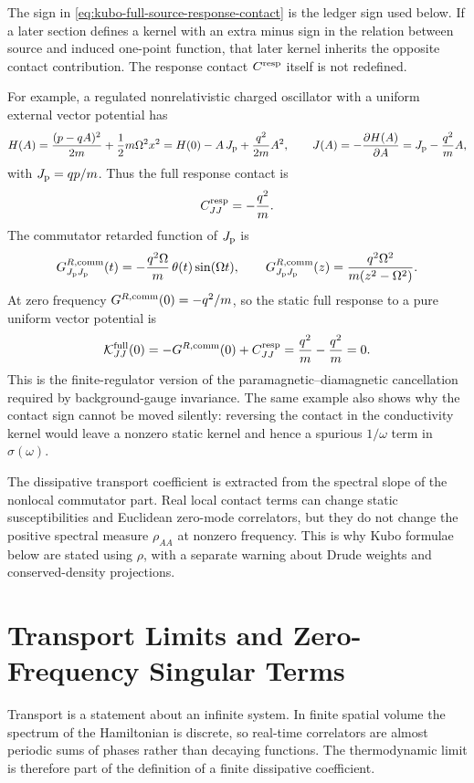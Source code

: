 The sign in \eqref{eq:kubo-full-source-response-contact} is the ledger sign
used below.  If a later section defines a kernel with an extra minus sign in
the relation between source and induced one-point function, that later kernel
inherits the opposite contact contribution.  The response contact
\(C^{\rm resp}\) itself is not redefined.

For example, a regulated nonrelativistic charged oscillator with a uniform
external vector potential has
\[
  H(A)=\frac{(p-qA)^2}{2m}+\frac12m\Omega^2x^2
  =
  H(0)-A\,J_{\rm p}+\frac{q^2}{2m}A^2,
  \qquad
  J(A)=-\frac{\partial H(A)}{\partial A}
  =J_{\rm p}-\frac{q^2}{m}A,
\]
with \(J_{\rm p}=qp/m\).  Thus the full response contact is
\[
  C^{\rm resp}_{JJ}=-\frac{q^2}{m}.
\]
The commutator retarded function of \(J_{\rm p}\) is
\[
  G^{R,\rm comm}_{J_{\rm p}J_{\rm p}}(t)
  =
  -\frac{q^2\Omega}{m}\,\theta(t)\sin(\Omega t),
  \qquad
  G^{R,\rm comm}_{J_{\rm p}J_{\rm p}}(z)
  =
  \frac{q^2\Omega^2}{m(z^2-\Omega^2)}.
\]
At zero frequency \(G^{R,\rm comm}(0)=-q^2/m\), so the static full response
to a pure uniform vector potential is
\[
  \mathcal K^{\rm full}_{JJ}(0)
  =
  -G^{R,\rm comm}(0)+C^{\rm resp}_{JJ}
  =
  \frac{q^2}{m}-\frac{q^2}{m}
  =
  0.
\]
This is the finite-regulator version of the paramagnetic--diamagnetic
cancellation required by background-gauge invariance.  The same example also
shows why the contact sign cannot be moved silently: reversing the contact in
the conductivity kernel would leave a nonzero static kernel and hence a
spurious \(1/\omega\) term in \(\sigma(\omega)\).

The dissipative transport coefficient is extracted from the spectral slope
of the nonlocal commutator part.  Real local contact terms can change static
susceptibilities and Euclidean zero-mode correlators, but they do not change
the positive spectral measure \(\rho_{AA}\) at nonzero frequency.  This is
why Kubo formulae below are stated using \(\rho\), with a separate warning
about Drude weights and conserved-density projections.

\section{Transport Limits and Zero-Frequency Singular Terms}

Transport is a statement about an infinite system.  In finite spatial volume
the spectrum of the Hamiltonian is discrete, so real-time correlators are
almost periodic sums of phases rather than decaying functions.  The
thermodynamic limit is therefore part of the definition of a finite
dissipative coefficient.

